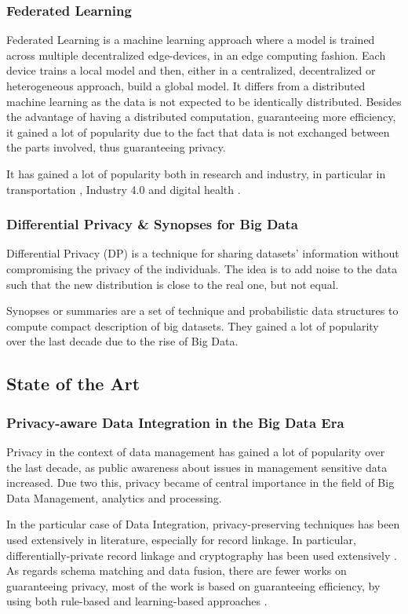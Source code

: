 \documentclass[12pt]{article}
\begin{document}
\subsubsection{Federated Learning}
Federated Learning is a machine learning approach where a model is trained across multiple decentralized edge-devices, in an edge computing fashion. Each device trains a local model and then, 
either in a centralized, decentralized or heterogeneous approach, build a global model. It differs from a distributed machine learning as the data is not expected to be identically distributed.
Besides the advantage of having a distributed computation, guaranteeing more efficiency, it gained a lot of popularity due to the fact that data is not exchanged between the parts involved, thus guaranteeing privacy.

It has gained a lot of popularity both in research and industry, in particular in transportation \cite*{Elbir2020}, Industry 4.0 \cite*{Shubyn2022} and digital health \cite*{Prayitno2021}.
\subsubsection{Differential Privacy \& Synopses for Big Data}
Differential Privacy (DP) is a technique for sharing datasets' information without compromising the privacy of the individuals. The idea is to add noise to the data such that the new distribution is close 
to the real one, but not equal. 

Synopses or summaries are a set of technique and probabilistic data structures to compute compact description of big datasets. They gained a lot of popularity over the last decade due to the rise of Big Data.

\subsection{State of the Art}
\subsubsection{Privacy-aware Data Integration in the Big Data Era}
Privacy in the context of data management has gained a lot of popularity over the last decade, as public awareness about issues in management sensitive data increased. Due two this,
privacy became of central importance in the field of Big Data Management, analytics and processing.

In the particular case of Data Integration, privacy-preserving techniques
has been used extensively in literature, especially for record linkage. In particular, differentially-private record linkage and cryptography has
been used extensively \cite*{Khurram2020,Vatsalan2017, Clifton, Kuzu2013, Gkoulalas-Divanis2021, Nobrega2021, Bonomi2012, Kuzu2013}. 
As regards schema matching and data fusion, there are fewer works on guaranteeing privacy, most of the work is based on guaranteeing efficiency, by using 
both rule-based and learning-based approaches \cite*{Rodrigues2021,Riedel2013,Saleem2009}.
\end{document}
